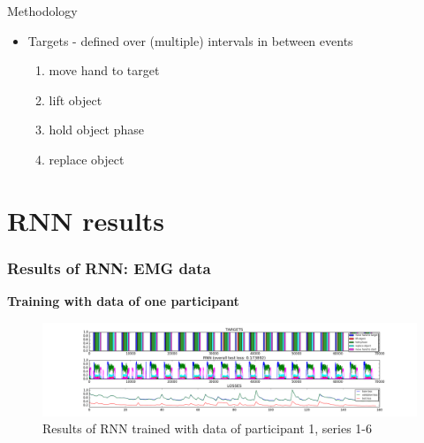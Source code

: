 \documentclass{beamer}
\begin{document}
\begin{frame}{Methodology}
{\begin{itemize}
                    \item Targets - defined over (multiple) intervals in between events
                    \begin{enumerate}
                    \item move hand to target
                        \item lift object
                        \item hold object phase
                        \item replace object
                    \end{enumerate}

                \end{itemize}

        }
\end{frame}


\section{RNN results}		

\begin{frame}
	\frametitle{Results of RNN: EMG data}
	\textbf{Training with data of one participant}
	\begin{figure}[ht]
		\centering
		\includegraphics[width=1.0\textwidth,trim={5cm 0cm 5cm 0cm},clip]{images/EMG-results_participant_1_series1-6.png}
		\caption{Results of RNN trained with data of participant 1, series 1-6}
	\end{figure}
\end{frame}
\end{document}

